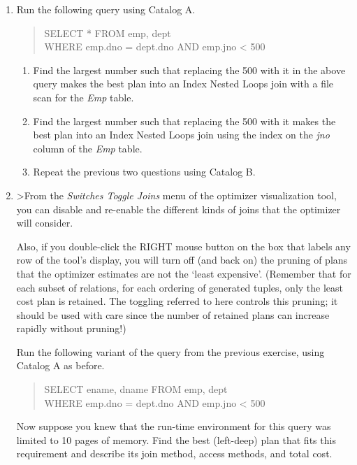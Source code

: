 \begin{enumerate}
\item

Run the following query using Catalog A.
\begin{quote}
	SELECT * FROM emp, dept\\
	WHERE emp.dno = dept.dno AND emp.jno < 500
\end{quote}

\begin{enumerate}
\item
Find the largest number such that replacing the 500 with it in the above
query makes the best plan into an Index Nested Loops join with a file
scan for the {\em Emp} table.
\item
Find the largest number such that replacing the 500 with it makes the
best plan into an Index Nested Loops join using the index on the {\em jno}
column of the {\em Emp} table.
\item
Repeat the previous two questions using Catalog B.
\end{enumerate}


\item

>From the {\em Switches \/ Toggle Joins} menu of the optimizer visualization tool,
you can disable and re-enable the different kinds of joins that the
optimizer will consider.

Also, if you double-click the RIGHT mouse button on the box that labels any
row of the tool's display, you will turn off (and back on) the pruning of plans
that the optimizer estimates are not the `least expensive'.  (Remember that
for each subset of relations, for each ordering of generated tuples,
only the least cost plan is retained.  The toggling referred to here
controls this pruning; it should be used with care since the number
of retained plans can increase rapidly without pruning!)

Run the following variant of the query from the previous
exercise, using Catalog A as before.  
\begin{quote}
        SELECT ename, dname FROM emp, dept\\
        WHERE emp.dno = dept.dno AND emp.jno < 500
\end{quote}

Now suppose you knew that the run-time environment for this query
was limited to 10 pages of memory.  Find the best (left-deep) plan that fits
this requirement and describe its join method, access methods, and total cost.



\end{enumerate}
